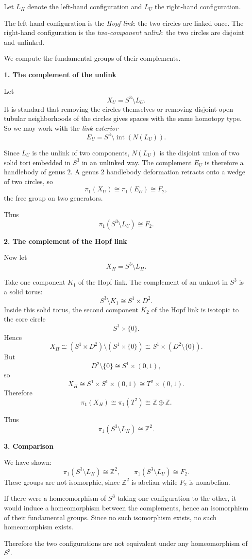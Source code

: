 \begin{solution}
Let \(L_H\) denote the left-hand configuration and \(L_U\) the right-hand configuration.

The left-hand configuration is the \emph{Hopf link}: the two circles are linked once.
The right-hand configuration is the \emph{two-component unlink}: the two circles are disjoint and unlinked.

We compute the fundamental groups of their complements.


\medskip
\noindent\textbf{1. The complement of the unlink}\par
\smallskip

Let
\[
X_U = S^3 \setminus L_U.
\]
It is standard that removing the circles themselves or removing disjoint open tubular neighborhoods of the circles gives spaces with the same homotopy type. So we may work with the \emph{link exterior}
\[
E_U = S^3 \setminus \operatorname{int}(N(L_U)).
\]

Since \(L_U\) is the unlink of two components, \(N(L_U)\) is the disjoint union of two solid tori embedded in \(S^3\) in an unlinked way. The complement \(E_U\) is therefore a handlebody of genus \(2\). A genus \(2\) handlebody deformation retracts onto a wedge of two circles, so
\[
\pi_1(X_U)\cong \pi_1(E_U)\cong F_2,
\]
the free group on two generators.

Thus
\[
\pi_1(S^3\setminus L_U)\cong F_2.
\]


\medskip
\noindent\textbf{2. The complement of the Hopf link}\par
\smallskip

Now let
\[
X_H = S^3 \setminus L_H.
\]

Take one component \(K_1\) of the Hopf link. The complement of an unknot in \(S^3\) is a solid torus:
\[
S^3 \setminus K_1 \cong S^1 \times D^2.
\]
Inside this solid torus, the second component \(K_2\) of the Hopf link is isotopic to the core circle
\[
S^1 \times \{0\}.
\]
Hence
\[
X_H \cong (S^1\times D^2)\setminus (S^1\times \{0\})
\cong S^1 \times (D^2\setminus \{0\}).
\]
But
\[
D^2\setminus \{0\}\cong S^1\times (0,1),
\]
so
\[
X_H \cong S^1\times S^1\times (0,1)\cong T^2\times (0,1).
\]
Therefore
\[
\pi_1(X_H)\cong \pi_1(T^2)\cong \mathbb{Z}\oplus \mathbb{Z}.
\]

Thus
\[
\pi_1(S^3\setminus L_H)\cong \mathbb{Z}^2.
\]


\medskip
\noindent\textbf{3. Comparison}\par
\smallskip

We have shown:
\[
\pi_1(S^3\setminus L_H)\cong \mathbb{Z}^2,
\qquad
\pi_1(S^3\setminus L_U)\cong F_2.
\]
These groups are not isomorphic, since \(\mathbb{Z}^2\) is abelian while \(F_2\) is nonabelian.

If there were a homeomorphism of \(S^3\) taking one configuration to the other, it would induce a homeomorphism between the complements, hence an isomorphism of their fundamental groups. Since no such isomorphism exists, no such homeomorphism exists.

\par

Therefore the two configurations are not equivalent under any homeomorphism of \(S^3\).
\end{solution}

